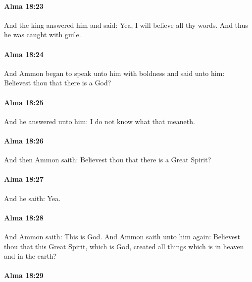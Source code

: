 		\paragraph{Alma 18:23} %
			\label{ALMA-18-23}

			And the king answered him and said:
			Yea, I will believe all thy words.
			And thus he was caught with guile.

		\paragraph{Alma 18:24} %
			\label{ALMA-18-24}

			And Ammon began to speak unto him with boldness and said unto him:
			Believest thou that there is a God?

		\paragraph{Alma 18:25} %
			\label{ALMA-18-25}

			And he answered unto him:
			I do not know what that meaneth.

		\paragraph{Alma 18:26} %
			\label{ALMA-18-26}

			And then Ammon saith:
			Believest thou that there is a Great Spirit?

		\paragraph{Alma 18:27} %
			\label{ALMA-18-27}

			And he saith: Yea.

		\paragraph{Alma 18:28} %
			\label{ALMA-18-28}

			And Ammon saith:
			This is God.
			And Ammon saith unto him again:
			Believest thou that this Great Spirit, which is God,
			created all things which is in heaven and in the earth?

		\paragraph{Alma 18:29} %
			\label{ALMA-18-29}

